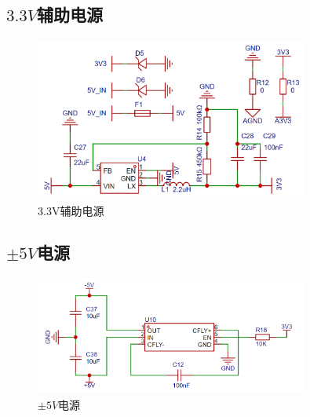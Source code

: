 \documentclass[a4paper,12pt]{article}
\begin{document}
\subsection*{$3.3V$辅助电源}
\begin{figure}[h]
    \centering
    \includegraphics[width=0.8\textwidth]{src/fig10.png}
    \caption{3.3V辅助电源}
\end{figure}
\subsection*{$\pm 5V$电源}
\begin{figure}[h]
    \centering
    \includegraphics[width=0.8\textwidth]{src/fig9.png}
    \caption{$\pm 5V$电源}
\end{figure}
\end{document}
